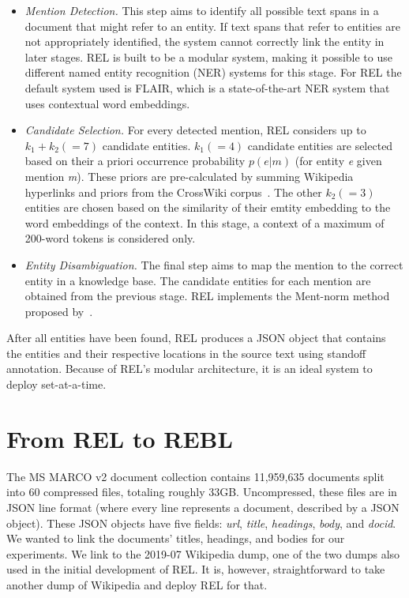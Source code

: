 \begin{itemize}
	\item \emph{Mention Detection.} 
	This step aims to identify all possible text spans in a document that might refer to an entity. If text spans that refer to entities are not appropriately identified, the system cannot correctly link the entity in later stages. REL is built to be a modular system, making it possible to use different named entity recognition (NER) systems for this stage. For REL the default system used is FLAIR, which is a state-of-the-art NER system that uses contextual word embeddings. 
	\item \emph{Candidate Selection.}
	For every detected mention, REL considers up to $k_1 + k_2 (=7)$ candidate entities. $k_1 (=4)$ candidate entities are selected based on their a priori occurrence probability $p(e|m)$ (for entity \textit{e} given mention \textit{m}). These priors are pre-calculated by summing Wikipedia hyperlinks and priors from the CrossWiki corpus~\citep{crosswiki}. The other $k_2 (=3)$ entities are chosen based on the similarity of their emtity embedding to the word embeddings of the context. In this stage, a context of a maximum of 200-word tokens is considered only.
	\item \emph{Entity Disambiguation.}
	The final step aims to map the mention to the correct entity in a knowledge base. The candidate entities for each mention are obtained from the previous stage. REL implements the Ment-norm method proposed by~\citet{ED-paper}.  
\end{itemize} 

After all entities have been found, REL produces a JSON object that contains the entities and their respective locations in the source text using standoff annotation. Because of REL's modular architecture, it is an ideal system to deploy set-at-a-time. 

\section{From REL to REBL}
The MS MARCO v2 document collection contains 11,959,635 documents split into 60 compressed files, totaling roughly 33GB. Uncompressed, these files are in JSON line format (where every line represents a document, described by a JSON object). These JSON objects have five fields: \textit{url}, \textit{title}, \textit{headings}, \textit{body}, and \textit{docid}. We wanted to link the documents' titles, headings, and bodies for our experiments. We link to the 2019-07 Wikipedia dump, one of the two dumps also used in the initial development of REL. It is, however, straightforward to take another dump of Wikipedia and deploy REL for that. 

